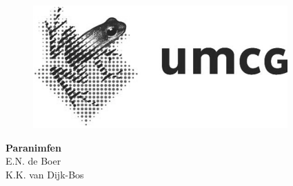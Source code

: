 \begin{figure}[!htbp]
  \centering

  \begin{minipage}[b]{0.24\textwidth}
    \includegraphics[width=\textwidth]{img/colofon_umcg_zw}
  \end{minipage}
  \hfill
  \begin{minipage}[b]{0.29\textwidth}
  \end{minipage}

\end{figure}

\clearpage



\clearpage

\noindent
\textbf{Paranimfen}\\
E.N. de Boer\\
K.K. van Dijk-Bos\\